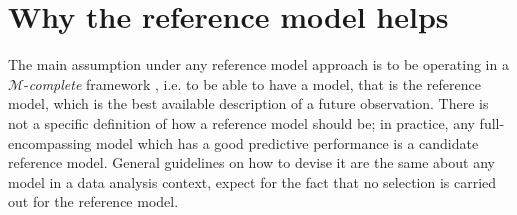 \documentclass[american,]{article}
\theoremstyle{definition}
\begin{document}
\hypertarget{reference-model-approach}{%
\section{Why the reference model helps}\label{reference-model-approach}}

The main assumption under any reference model approach is to be operating in a $\mathcal{M}$-\textit{complete} framework \citep{book:bernardo_smith,paper:vehtari_ojanen}, i.e. to be able to have a model, that is the reference model, which is the best available description of a future observation. There is not a specific definition of how a reference model should be; in practice, any full-encompassing model which has a good predictive performance is a candidate reference model. General guidelines on how to devise it are the same about any model in a data analysis context, expect for the fact that no selection is carried out for the reference model.
 
\end{document}
